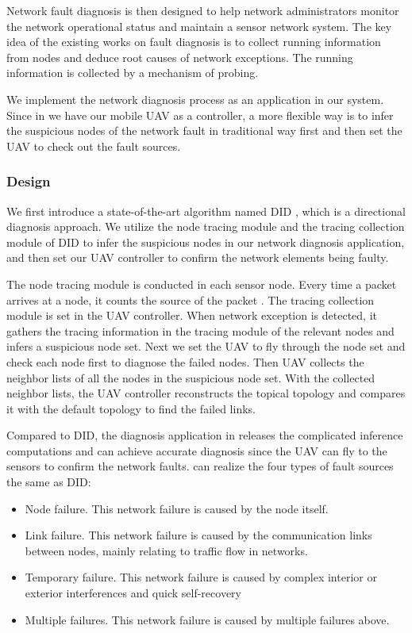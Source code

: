 Network fault diagnosis is then designed to help network administrators monitor the network 
operational status and maintain a sensor network system. The key idea of the existing works
on fault diagnosis is to collect running information from nodes and deduce root causes of network
exceptions. The running information is collected by a mechanism of probing.

We implement the network diagnosis process as an application in our {\sdn} system.
Since in {\sdn} we have our mobile UAV as a controller, a more flexible way is to infer the suspicious 
nodes of the network fault in traditional way first and then set the UAV to check out the fault sources. 
 
\subsubsection{Design}

We first introduce a state-of-the-art algorithm named DID 
\cite{gong2015directional}, which is a directional diagnosis approach.
We utilize the node tracing module and the tracing collection module of DID
to infer the suspicious nodes in our network diagnosis application, 
and then set our UAV controller to confirm the network elements being faulty.

The node tracing module is conducted in each sensor node. 
Every time a packet arrives at a node, it counts
the source of the packet . The tracing collection module
is set in the UAV controller. When network exception is detected, 
it gathers the tracing information in the tracing module of the relevant nodes
and infers a suspicious node set. Next we set the UAV to fly through the 
node set and check each node first to diagnose the failed nodes. 
Then UAV collects the neighbor lists of all the nodes in the suspicious node set.
With the collected neighbor lists, the UAV controller reconstructs the topical topology and 
compares it with the default topology to find the failed links.

Compared to DID, the diagnosis application in {\sdn} releases the complicated inference
computations and can achieve accurate diagnosis since the UAV can fly to the sensors 
to confirm the network faults. {\sdn} can realize the four types of fault sources the same as DID:  
\begin{itemize}
\item	Node failure. This network failure is caused by the node itself.
\item	Link failure. This network failure is caused by the communication links 
between nodes, mainly relating to traffic flow in networks.
\item	Temporary failure. This  network failure is caused by complex interior or exterior 
interferences and quick self-recovery
\item	Multiple failures. This  network failure is caused by multiple failures above.
\end{itemize}

